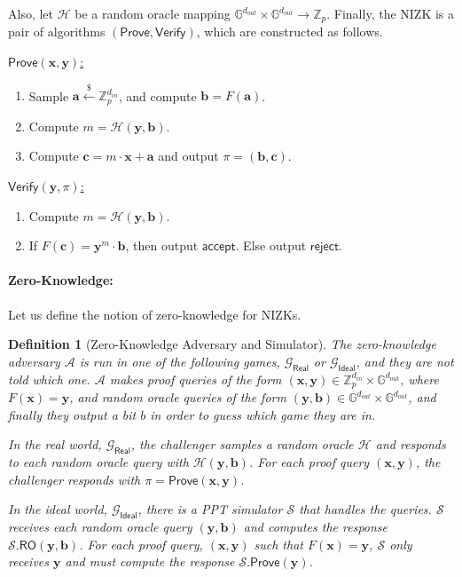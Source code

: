\documentclass[11pt]{article}
\newtheorem{definition}[theorem]{Definition}
\numberwithin{equation}{section}
\newcommand{\bfa}{\mathbf{a}}
\newcommand{\bfb}{\mathbf{b}}
\newcommand{\bfc}{\mathbf{c}}
\newcommand{\bfx}{\mathbf{x}}
\newcommand{\bfy}{\mathbf{y}}
\newcommand{\bbG}{\mathbb{G}}
\newcommand{\bbZ}{\mathbb{Z}}
\newcommand{\cA}{\mathcal{A}}
\newcommand{\cG}{\mathcal{G}}
\newcommand{\cH}{\mathcal{H}}
\newcommand{\cS}{\mathcal{S}}
\newcommand{\Prove}{\mathsf{Prove}}
\newcommand{\Verify}{\mathsf{Verify}}
\newcommand{\RO}{\mathsf{RO}}
\newcommand{\getsr}{\stackrel{\$}{\gets}}
\begin{document}
Also, let $\cH$ be a random oracle mapping $\bbG^{d_{out}} \times \bbG^{d_{out}} \to \bbZ_p$. Finally, the NIZK is a pair of algorithms $(\Prove, \Verify)$, which are constructed as follows.\newline

\noindent\underline{$\Prove(\bfx, \bfy)$:}
\begin{enumerate}
    \item Sample $\bfa \getsr \bbZ_p^{d_{in}}$, and compute $\bfb = F(\bfa)$.
    \item Compute $m = \cH(\bfy, \bfb)$.
    \item Compute $\bfc = m \cdot \bfx + \bfa$ and output $\pi = (\bfb, \bfc)$.
\end{enumerate}

\noindent\underline{$\Verify(\bfy, \pi)$:}
\begin{enumerate}
    \item Compute $m = \cH(\bfy, \bfb)$.
    \item If $F(\bfc) = \bfy^m \cdot \bfb$, then output $\mathsf{accept}$. Else output $\mathsf{reject}$.
\end{enumerate}

\paragraph{Zero-Knowledge:}
Let us define the notion of zero-knowledge for NIZKs. 

\begin{definition}[Zero-Knowledge Adversary and Simulator]
    The zero-knowledge adversary $\cA$ is run in one of the following games, $\cG_{\mathsf{Real}}$ or $\cG_{\mathsf{Ideal}}$, and they are not told which one. $\cA$ makes \textit{proof queries} of the form $(\bfx, \bfy) \in \bbZ_p^{d_{in}} \times \bbG^{d_{out}}$, where $F(\bfx) = \bfy$, and \textit{random oracle queries} of the form $(\bfy, \bfb) \in \bbG^{d_{out}} \times \bbG^{d_{out}}$, and finally they output a bit $b$ in order to guess which game they are in.
    
    In the \textit{real world}, $\cG_{\mathsf{Real}}$, the challenger samples a random oracle $\cH$ and responds to each random oracle query with $\cH(\bfy, \bfb)$. For each proof query $(\bfx, \bfy)$, the challenger responds with $\pi = \Prove(\bfx, \bfy)$.

    In the \textit{ideal world}, $\cG_{\mathsf{Ideal}}$, there is a PPT simulator $\cS$ that handles the queries. $\cS$ receives each random oracle query $(\bfy, \bfb)$ and computes the response $\cS.\RO(\bfy, \bfb)$. For each proof query, $(\bfx, \bfy)$ such that $F(\bfx) = \bfy$, $\cS$ only receives $\bfy$ and must compute the response $\cS.\Prove(\bfy)$.
\end{definition}
\end{document}
